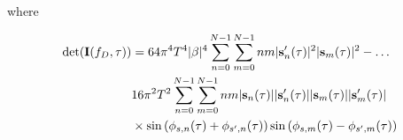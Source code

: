 \documentclass[12pt,a4paper,twoside,english]{article}
\begin{document}
where

\begin{align}
  \textrm{det}(\mathbf{I}(f_D,\tau)) & =  64 \pi^4 T^4 |\beta|^4 \sum^{N-1}_{n=0}\sum^{N-1}_{m=0}nm|\mathbf{s}^{\prime}_n
                                 (\tau)|^2|\mathbf{s}_m (\tau)|^2 - \ldots \nonumber \\
                                 & 16 \pi^2 T^2 \sum^{N-1}_{n=0}\sum^{N-1}_{m=0} nm|\mathbf{s}_n
                                   (\tau)||\mathbf{s}_n^{\prime} (\tau)||\mathbf{s}_m(\tau)||\mathbf{s}_m^{\prime} (\tau)| \nonumber \\
                               & \times \sin{(\phi_{s,n}(\tau) + \phi_{s^{\prime},n}(\tau))}
     \sin{(\phi_{s,m}(\tau) - \phi_{s^{\prime},m}(\tau))}
\end{align}
\end{document}
